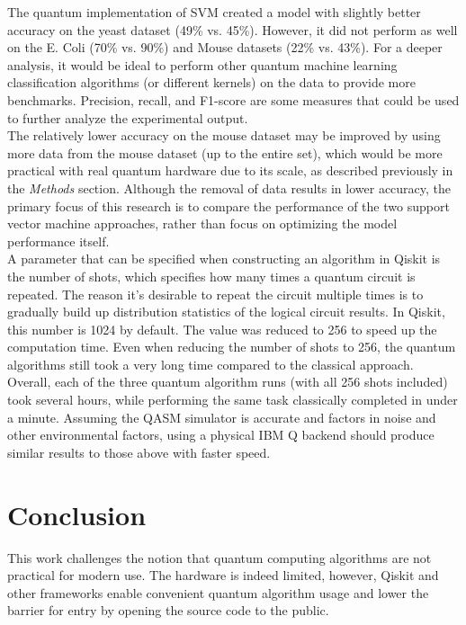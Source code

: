 \documentclass{article}
\begin{document}
  The quantum implementation of SVM created a model with slightly better accuracy on the yeast dataset (49\% vs. 45\%). However, it did not perform as well on the E. Coli (70\% vs. 90\%) and Mouse datasets (22\% vs. 43\%). For a deeper analysis, it would be ideal to perform other quantum machine learning classification algorithms (or different kernels) on the data to provide more benchmarks. Precision, recall, and F1-score are some measures that could be used to further analyze the experimental output. \\

  The relatively lower accuracy on the mouse dataset may be improved by using more data from the mouse dataset (up to the entire set), which would be more practical with real quantum hardware due to its scale, as described previously in the \textit{Methods} section. Although the removal of data results in lower accuracy, the primary focus of this research is to compare the performance of the two support vector machine approaches, rather than focus on optimizing the model performance itself. \\

  A parameter that can be specified when constructing an algorithm in Qiskit is the number of shots, which specifies how many times a quantum circuit is repeated. The reason it's desirable to repeat the circuit multiple times is to gradually build up distribution statistics of the logical circuit results. In Qiskit, this number is 1024 by default. The value was reduced to 256 to speed up the computation time. Even when reducing the number of shots to 256, the quantum algorithms still took a very long time compared to the classical approach. Overall, each of the three quantum algorithm runs (with all 256 shots included) took several hours, while performing the same task classically completed in under a minute. Assuming the QASM simulator is accurate and factors in noise and other environmental factors, using a physical IBM Q backend should produce similar results to those above with faster speed.

\section{Conclusion}
  This work challenges the notion that quantum computing algorithms are not practical for modern use. The hardware is indeed limited, however, Qiskit and other frameworks enable convenient quantum algorithm usage and lower the barrier for entry by opening the source code to the public. \\
\end{document}
